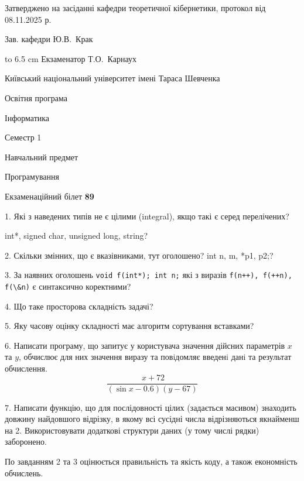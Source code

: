 \documentclass[12pt, ukrainian]{article}
\def\code#1{\Verb!#1!}
\begin{document}
{\smallskip\smallskip \begin {scriptsize} Затверджено на засіданні кафедри теоретичної кібернетики, протокол   від   08.11.2025 р.\par\smallskip\smallskip\smallskip\smallskip
{\parbox {6.5 cm} {Зав. кафедри \dotfill Ю.В.~Крак}}\hspace {0.7cm} {\hbox to 6.5 cm { Екзаменатор \dotfill Т.О.~Карнаух}} \end{scriptsize}}
\newpage
{{\begin {scriptsize}\par
{ \center  Київський національний університет імені Тараса Шевченка \par}
{\parbox {5 cm}{Освітня програма \hfill}{\parbox {7 cm}{Інформатика\hfill}}\parbox {6 cm}{\hfill Семестр 1}}\par
{\parbox {5 cm} {Навчальний предмет \hfill}\parbox {7 cm}{Програмування \hfill}\parbox {6cm}{\hfill}\par}\vspace{-15pt} \end{scriptsize}}{\center Екзаменаційний білет \No \textbf { 89 }\par}}
{%
1. Які з наведених типів не є цілими (integral), якщо такі є серед перелічених?

int*, signed char, unsigned long, string?
\par
\vspace{2mm}
2. Скільки змінних, що є вказівниками, тут оголошено?
int n, m, *p1, p2;?
\par
\vspace{2mm}
3. За наявних оголошень \code{void f(int*); int n;} які з виразів \code{f(n++), f(++n), f(\&n)} є синтаксично коректними?
\par
\vspace{2mm}
4. Що таке просторова складність задачі?
\par
\vspace{2mm}
5. Яку часову оцінку складності має алгоритм сортування вставками?
\par
\vspace{2mm}
6. Написати програму, що запитує у користувача значення дійсних параметрів $x$ та $y$, обчислює для них значення виразу та повiдомляє введенi данi та результат обчислення.
$$\frac{\ x + 72}{(\sin x - 0.6) (y - 67)}$$ 

\par
7. Написати функцію, що для послідовності цілих (задається масивом) знаходить довжину найдовшого відрізку, в якому всі сусідні числа відрізняються якнайменш на 2. Використовувати додаткові структури даних (у тому числі рядки) заборонено.

По завданням 2 та 3 оцінюється правильність та якість коду, а також економність обчислень.

}
\end{document}
